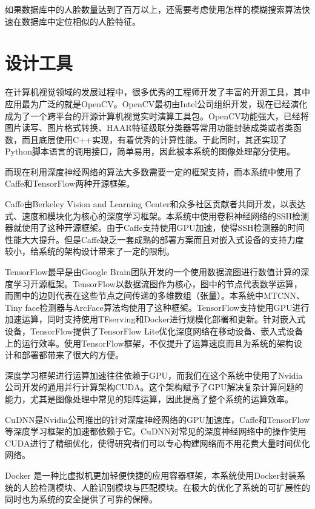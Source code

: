 如果数据库中的人脸数量达到了百万以上，还需要考虑使用怎样的模糊搜索算法快速在数据库中定位相似的人脸特征。

\section{设计工具}

在计算机视觉领域的发展过程中，很多优秀的工程师开发了丰富的开源工具，其中应用最为广泛的就是OpenCV。OpenCV最初由Intel公司组织开发，现在已经演化成为了一个跨平台的开源计算机视觉实时演算工具包。OpenCV功能强大，已经将图片读写、图片格式转换、HAAR特征级联分类器等常用功能封装成类或者类函数，而且底层使用C++实现，有着优秀的计算性能。于此同时，其还实现了Python脚本语言的调用接口，简单易用，因此被本系统的图像处理部分使用。

而现在利用深度神经网络的算法大多数需要一定的框架支持，而本系统中使用了Caffe和TensorFlow两种开源框架。

Caffe由Berkeley Vision and Learning Center和众多社区贡献者共同开发，以表达式、速度和模块化为核心的深度学习框架。本系统中使用卷积神经网络的SSH检测器就使用了这种开源框架。由于Caffe支持使用GPU加速，使得SSH检测器的时间性能大大提升。但是Caffe缺乏一套成熟的部署方案而且对嵌入式设备的支持力度较小，给系统的架构设计带来了一定的限制。

TensorFlow最早是由Google Brain团队开发的一个使用数据流图进行数值计算的深度学习开源框架。TensorFlow以数据流图作为核心，图中的节点代表数学运算，而图中的边则代表在这些节点之间传递的多维数组（张量）。本系统中MTCNN、Tiny face检测器与ArcFace算法均使用了这种框架。TensorFlow支持使用GPU进行加速运算，同时支持使用TFserving和Docker进行规模化部署和更新。针对嵌入式设备，TensorFlow提供了TensorFlow Lite优化深度网络在移动设备、嵌入式设备上的运行效率。使用TensorFlow框架，不仅提升了运算速度而且为系统的架构设计和部署都带来了很大的方便。

深度学习框架进行运算加速往往依赖于GPU，而我们在这个系统中使用了Nvidia公司开发的通用并行计算架构CUDA。这个架构赋予了GPU解决复杂计算问题的能力，尤其是图像处理中常见的矩阵运算，因此提高了整个系统的运算效率。

CuDNN是Nvidia公司推出的针对深度神经网络的GPU加速库，Caffe和TensorFlow等深度学习框架的加速都依赖于它。CuDNN对常见的深度神经网络中的操作使用CUDA进行了精细优化，使得研究者们可以专心构建网络而不用花费大量时间优化网络。

Docker 是一种比虚拟机更加轻便快捷的应用容器框架，本系统使用Docker封装系统的人脸检测模块、人脸识别模块与匹配模块。在极大的优化了系统的可扩展性的同时也为系统的安全提供了可靠的保障。
